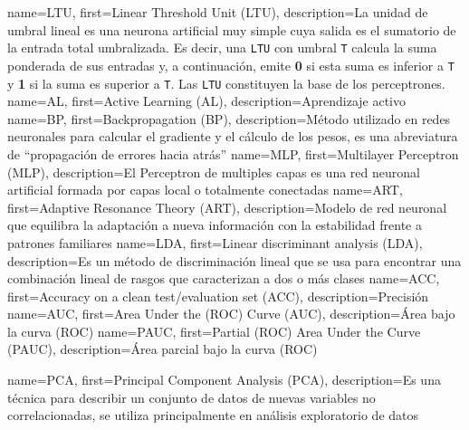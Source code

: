       {name={LTU},        first={Linear Threshold Unit (LTU)},                    description={La unidad de umbral lineal es una neurona artificial muy simple cuya salida es el sumatorio de la entrada total umbralizada. Es decir, una \texttt{LTU} con umbral \texttt{T} calcula la suma ponderada de sus entradas y, a continuación, emite \textbf{0} si esta suma es inferior a \texttt{T} y \textbf{1} si la suma es superior a \texttt{T}. Las \texttt{LTU} constituyen la base de los perceptrones. \cite{mldict}}}
       {name={AL},         first={Active Learning (AL)},                           description={Aprendizaje activo}}
    {name={BP},         first={Backpropagation (BP)},                           description={Método utilizado en redes neuronales para calcular el gradiente y el cálculo de los pesos, es una abreviatura de ``propagación de errores hacia atrás''}}
      {name={MLP},        first={Multilayer Perceptron (MLP)},                    description={El Perceptron de multiples capas es una red neuronal artificial formada por capas local o totalmente conectadas}}
   {name={ART},        first={Adaptive Resonance Theory (ART)},                description={Modelo de red neuronal que equilibra la adaptación a nueva información con la estabilidad frente a patrones familiares}}
      {name={LDA},        first={Linear discriminant analysis (LDA)},             description={Es un método de discriminación lineal que se usa para encontrar una combinación lineal de rasgos que caracterizan a dos o más clases}}
      {name={ACC},        first={Accuracy on a clean test/evaluation set (ACC)},  description={Precisión}}
      {name={AUC},        first={Area Under the (ROC) Curve (AUC)},               description={Área bajo la curva (ROC)}}
     {name={PAUC},       first={Partial (ROC) Area Under the Curve (PAUC)},      description={Área parcial bajo la curva (ROC)}}

      {name={PCA},    first={Principal Component Analysis (PCA)}, description={Es una técnica para describir un conjunto de datos de nuevas variables no correlacionadas, se utiliza principalmente en análisis exploratorio de datos}}



